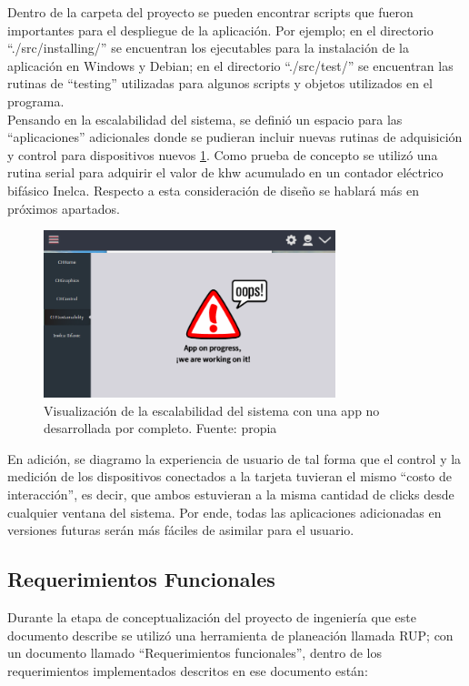 Dentro de la carpeta del proyecto se pueden encontrar scripts que fueron importantes para el despliegue de la aplicación. Por ejemplo; en el directorio ``./src/installing/'' se encuentran los ejecutables para la instalación de la aplicación en Windows y Debian; en el directorio ``./src/test/'' se encuentran las rutinas de “testing” utilizadas para algunos scripts y objetos utilizados en el programa.
\vspace{0.5cm}\\
Pensando en la escalabilidad del sistema, se definió un espacio para las ``aplicaciones'' adicionales donde se pudieran incluir nuevas rutinas de adquisición y control para dispositivos nuevos \ref{fig_6}. Como prueba de concepto se utilizó una rutina serial para adquirir el valor de khw acumulado en un contador eléctrico bifásico Inelca. Respecto a esta consideración de diseño se hablará más en próximos apartados.
\vspace{0.5cm}\\

\begin{figure}[htbp]
	\centerline{\includegraphics[width=8.5cm]{figuras/housemanager_newapp.png}}
	\caption{Visualización de la escalabilidad del sistema con una app no desarrollada por completo. Fuente: propia}
	\label{fig_6}
\end{figure}

En adición, se diagramo la experiencia de usuario de tal forma que el control y la medición de los dispositivos conectados a la tarjeta tuvieran el mismo ``costo de interacción'', es decir, que ambos estuvieran a la misma cantidad de clicks desde cualquier ventana del sistema. Por ende, todas las aplicaciones adicionadas en versiones futuras serán más fáciles de asimilar para el usuario.

\subsection{Requerimientos Funcionales}

Durante la etapa de conceptualización del proyecto de ingeniería que este documento describe se utilizó una herramienta de planeación llamada RUP; con un documento llamado ``Requerimientos funcionales'', dentro de los requerimientos implementados descritos en ese documento están: 

